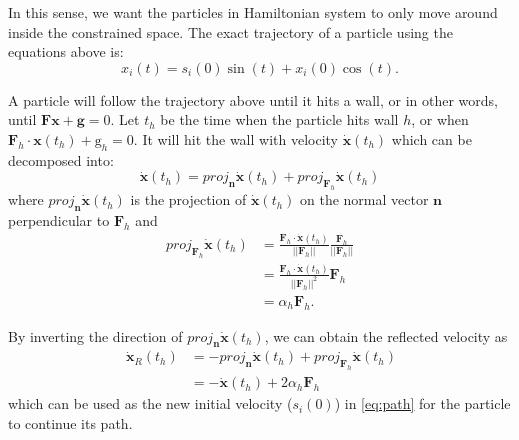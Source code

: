 \documentclass{scrartcl}
\numberwithin{equation}{section}
\begin{document}
In this sense, we want the particles in Hamiltonian system to only move around inside the constrained space. The exact trajectory of a particle using the equations above is:    
\begin{equation}\label{eq:path}
	x_i(t) = s_i(0)\sin(t) + x_i(0)\cos(t).
\end{equation}

A particle will follow the trajectory above until it hits a wall, or in other words, until $\textbf{F}\textbf{x} + \textbf{g} = 0$. Let $t_h$ be the time when the particle hits wall $h$, or when $\textbf{F}_h \cdot \textbf{x}(t_h) + \text{g}_h = 0$. It will hit the wall with velocity $\dot{\textbf{x}}(t_h)$ which can be decomposed into:   
\begin{equation}\label{eq:bounce}
	\dot{\textbf{x}}(t_h) = proj_{\textbf{n}}\dot{\textbf{x}}(t_h) + proj_{\textbf{F}_h}\dot{\textbf{x}}(t_h)
\end{equation}
where $proj_{\textbf{n}}\dot{\textbf{x}}(t_h)$ is the projection of $\dot{\textbf{x}}(t_h)$ on the normal vector $\textbf{n}$ perpendicular to $\textbf{F}_h$ and
\begin{equation}\label{eq:proj}
\begin{split}
	proj_{\textbf{F}_h}\dot{\textbf{x}}(t_h) &= \frac{\textbf{F}_h \cdot \dot{\textbf{x}}(t_h)}{||\textbf{F}_h||}\frac{\textbf{F}_h}{||\textbf{F}_h||}\\  
	&= \frac{\textbf{F}_h \cdot \dot{\textbf{x}}(t_h)}{||\textbf{F}_h||^2}\textbf{F}_h \\
	&= \alpha_h\textbf{F}_h.
\end{split}
\end{equation}

By inverting the direction of $proj_{\textbf{n}}\dot{\textbf{x}}(t_h)$, we can obtain the reflected velocity as
\begin{equation}\
\begin{split}
	\dot{\textbf{x}}_R(t_h) & = -proj_{\textbf{n}}\dot{\textbf{x}}(t_h) + proj_{\textbf{F}_h}\dot{\textbf{x}}(t_h) \\
	& = -\dot{\textbf{x}}(t_h) + 2\alpha_h\textbf{F}_h
\end{split}
\end{equation}
which can be used as the new initial velocity ($s_i(0)$) in \eqref{eq:path} for the particle to continue its path.



\end{document}
